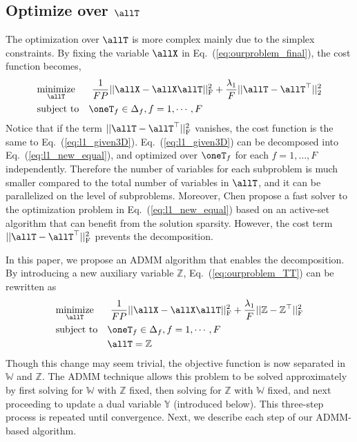 \subsection{Optimize over $\allT$} \label{sec:initlization}
The optimization over $\allT$ is more complex mainly due to the simplex constraints.
By fixing the variable $\allX$ in Eq.~(\ref{eq:ourproblem_final}), the cost function becomes,
\begin{equation}
\begin{aligned}
& \underset{ \allT }{\text{minimize}}&& ~ \frac{1}{FP} || \allX - \allX \allT||_\text{F}^2
 + \frac{\lambda_1}{F} ||\allT - \allT^\top||_2^2 \\
& \text{subject to} && \oneT_f \in \Delta_f, f=1,\cdots,F
\end{aligned}
\label{eq:ourproblem_TT}
\end{equation}
Notice that if the term $||\allT - \allT^\top||_\text{F}^2$ vanishes, the cost function is the same to Eq.~(\ref{eq:l1_given3D}). Eq.~(\ref{eq:l1_given3D}) can be decomposed into Eq.~(\ref{eq:l1_new_equal}), and optimized over $\oneT_f$ for each $f=1,\dots,F$ independently.
Therefore the number of variables for each subproblem is much smaller compared to the total number of variables in $\allT$, and it can be parallelized on the level of subproblems.
Moreover, Chen \etal \cite{chen:hal-00995911} propose a fast solver to the optimization problem in Eq.~(\ref{eq:l1_new_equal}) based on an active-set algorithm that can benefit from the solution sparsity.
However, the cost term $||\allT - \allT^\top||_\text{F}^2$ prevents the decomposition.

In this paper, we propose an ADMM algorithm that enables the decomposition.
By introducing a new auxiliary variable $\mathbb{Z}$, Eq.~(\ref{eq:ourproblem_TT}) can be rewritten as
\begin{equation}
\begin{aligned}
& \underset{ \allT }{\text{minimize}}&& ~ \frac{1}{FP} || \allX - \allX \allT||_\text{F}^2
 + \frac{\lambda_1}{F} ||\mathbb{Z} - \mathbb{Z}^\top||_\text{F}^2 \\
& \text{subject to} && \oneT_f \in \Delta_f, f=1,\cdots,F \\
&                   && \allT = \mathbb{Z}
\end{aligned}
\end{equation}
Though this change may seem trivial, the objective function is now separated in $\mathbb{W}$ and $\mathbb{Z}$. 
The ADMM technique allows this problem to be solved approximately by first solving for $\mathbb{W}$ with $\mathbb{Z}$ fixed, then solving for $\mathbb{Z}$ with $\mathbb{W}$ fixed, and next proceeding to update a dual variable $\mathbb{Y}$ (introduced below). This three-step process is repeated until convergence. Next, we describe each step of our ADMM-based algorithm. 

